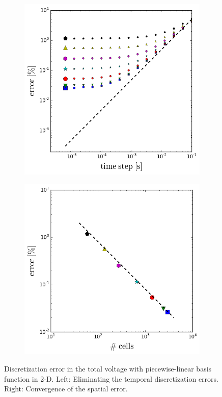 \begin{figure}
    \begin{subfigure}{0.49\textwidth}
        \includegraphics[width=\textwidth]{figures/temporal_error_convergence}
    \end{subfigure}
    \begin{subfigure}{0.49\textwidth}
        \includegraphics[width=\textwidth]{figures/spatial_error_convergence}
    \end{subfigure}
    \caption{Discretization error in the total voltage with piecewise-linear
    basis function in 2-D.
    Left:  Eliminating the temporal discretization errors.
    Right:  Convergence of the spatial  error.}
    \label{fig:error_convergence}
\end{figure}

